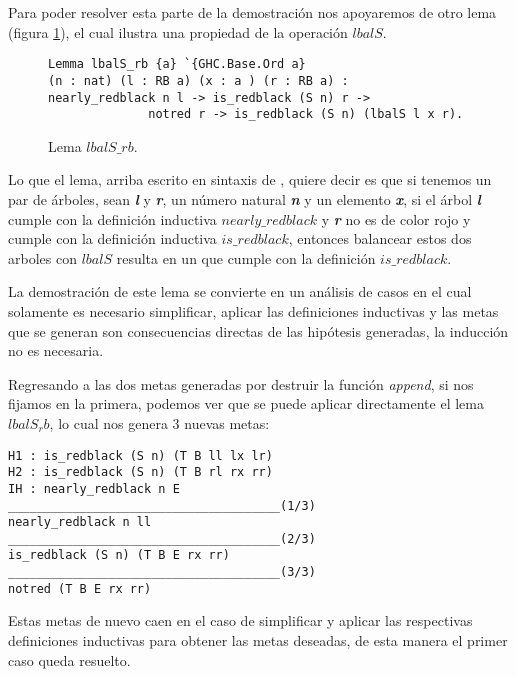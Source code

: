Para poder resolver esta parte de la demostraci\'on nos apoyaremos de otro lema (figura
\ref{lema_5}), el cual ilustra una propiedad de la operaci\'on \hyperref[lbalS]{$lbalS$}.

\begin{figure}[!ht]
\centering
\captionsetup{justification=centering}
\begin{verbatim}
Lemma lbalS_rb {a} `{GHC.Base.Ord a}
(n : nat) (l : RB a) (x : a ) (r : RB a) :
nearly_redblack n l -> is_redblack (S n) r ->
              notred r -> is_redblack (S n) (lbalS l x r).
\end{verbatim}
\caption{Lema $lbalS\_rb$.}
\label{lema_5}
\end{figure}


Lo que el lema, arriba escrito en sintaxis de {\coq}, quiere decir es que si tenemos un par de
\'arboles, sean \textbf{\textit{l}} y \textbf{\textit{r}}, un n\'umero natural \textbf{\textit{n}} y
un elemento \textbf{\textit{x}}, si el \'arbol \textbf{\textit{l}} cumple con la
definici\'on inductiva \hyperref[inductive_isRedB]{$nearly\_redblack$} y \textbf{\textit{r}} no es de color rojo y 
cumple con la definici\'on inductiva \hyperref[inductive_isRedB]{$is\_redblack$}, entonces balancear 
estos dos arboles con \hyperref[lbalS]{$lbalS$} resulta en un {\arn} que cumple con la definici\'on 
$is\_redblack$.

La demostraci\'on de este lema se convierte en un análisis de casos en el cual solamente es
necesario simplificar, aplicar las definiciones inductivas y las metas que se generan son
consecuencias directas de las hipótesis generadas, la inducci\'on no es necesaria.

Regresando a las dos metas generadas por destruir la funci\'on \emph{append}, si nos fijamos en la primera,
podemos ver que se puede aplicar directamente el lema $lbalS_rb$, lo cual nos genera 3 nuevas 
metas:

\begin{verbatim}
H1 : is_redblack (S n) (T B ll lx lr)
H2 : is_redblack (S n) (T B rl rx rr)
IH : nearly_redblack n E
______________________________________(1/3)
nearly_redblack n ll
______________________________________(2/3)
is_redblack (S n) (T B E rx rr)
______________________________________(3/3)
notred (T B E rx rr)
\end{verbatim}

Estas metas de nuevo caen en el caso de simplificar y aplicar las respectivas definiciones
inductivas para obtener las metas deseadas, de esta manera el primer caso queda resuelto.

